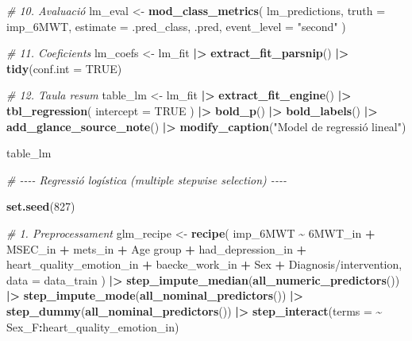 \documentclass[CAT]{TFUOC}%
\newenvironment{Shaded}{\begin{snugshade}}{\end{snugshade}}
\newcommand{\AttributeTok}[1]{\textcolor[rgb]{0.13,0.29,0.53}{#1}}
\newcommand{\CommentTok}[1]{\textcolor[rgb]{0.56,0.35,0.01}{\textit{#1}}}
\newcommand{\ConstantTok}[1]{\textcolor[rgb]{0.56,0.35,0.01}{#1}}
\newcommand{\DecValTok}[1]{\textcolor[rgb]{0.00,0.00,0.81}{#1}}
\newcommand{\FunctionTok}[1]{\textcolor[rgb]{0.13,0.29,0.53}{\textbf{#1}}}
\newcommand{\NormalTok}[1]{#1}
\newcommand{\OtherTok}[1]{\textcolor[rgb]{0.56,0.35,0.01}{#1}}
\newcommand{\SpecialCharTok}[1]{\textcolor[rgb]{0.81,0.36,0.00}{\textbf{#1}}}
\newcommand{\StringTok}[1]{\textcolor[rgb]{0.31,0.60,0.02}{#1}}
\begin{document}
\begin{Shaded}
\begin{Highlighting}[]
\CommentTok{\# 10. Avaluació}
\NormalTok{lm\_eval }\OtherTok{\textless{}{-}} \FunctionTok{mod\_class\_metrics}\NormalTok{(}
\NormalTok{  lm\_predictions, }
  \AttributeTok{truth =}\NormalTok{ imp\_6MWT, }
  \AttributeTok{estimate =}\NormalTok{ .pred\_class, }
\NormalTok{  .pred, }
  \AttributeTok{event\_level =} \StringTok{"second"}
\NormalTok{)}

\CommentTok{\# 11. Coeficients}
\NormalTok{lm\_coefs }\OtherTok{\textless{}{-}}\NormalTok{ lm\_fit }\SpecialCharTok{|\textgreater{}} 
  \FunctionTok{extract\_fit\_parsnip}\NormalTok{() }\SpecialCharTok{|\textgreater{}} 
  \FunctionTok{tidy}\NormalTok{(}\AttributeTok{conf.int =} \ConstantTok{TRUE}\NormalTok{)}

\CommentTok{\# 12. Taula resum}
\NormalTok{table\_lm }\OtherTok{\textless{}{-}}\NormalTok{ lm\_fit }\SpecialCharTok{|\textgreater{}} 
  \FunctionTok{extract\_fit\_engine}\NormalTok{() }\SpecialCharTok{|\textgreater{}} 
  \FunctionTok{tbl\_regression}\NormalTok{(}
    \AttributeTok{intercept =} \ConstantTok{TRUE}
\NormalTok{  ) }\SpecialCharTok{|\textgreater{}} 
  \FunctionTok{bold\_p}\NormalTok{() }\SpecialCharTok{|\textgreater{}} 
  \FunctionTok{bold\_labels}\NormalTok{() }\SpecialCharTok{|\textgreater{}} 
  \FunctionTok{add\_glance\_source\_note}\NormalTok{() }\SpecialCharTok{|\textgreater{}} 
  \FunctionTok{modify\_caption}\NormalTok{(}\StringTok{"Model de regressió lineal"}\NormalTok{)}

\NormalTok{table\_lm}

\CommentTok{\# {-}{-}{-}{-} Regressió logística (multiple stepwise selection) {-}{-}{-}{-}}

\FunctionTok{set.seed}\NormalTok{(}\DecValTok{827}\NormalTok{)}

\CommentTok{\# 1. Preprocessament}
\NormalTok{glm\_recipe }\OtherTok{\textless{}{-}} \FunctionTok{recipe}\NormalTok{(}
\NormalTok{  imp\_6MWT }\SpecialCharTok{\textasciitilde{}} \StringTok{\textasciigrave{}}\AttributeTok{6MWT\_in}\StringTok{\textasciigrave{}} \SpecialCharTok{+}\NormalTok{ MSEC\_in }\SpecialCharTok{+}\NormalTok{ mets\_in }\SpecialCharTok{+} \StringTok{\textasciigrave{}}\AttributeTok{Age group}\StringTok{\textasciigrave{}} \SpecialCharTok{+}\NormalTok{ had\_depression\_in }\SpecialCharTok{+} 
\NormalTok{    heart\_quality\_emotion\_in }\SpecialCharTok{+}\NormalTok{ baecke\_work\_in }\SpecialCharTok{+}\NormalTok{ Sex }\SpecialCharTok{+} \StringTok{\textasciigrave{}}\AttributeTok{Diagnosis/intervention}\StringTok{\textasciigrave{}}\NormalTok{, }
  \AttributeTok{data =}\NormalTok{ data\_train}
\NormalTok{) }\SpecialCharTok{|\textgreater{}} 
  \FunctionTok{step\_impute\_median}\NormalTok{(}\FunctionTok{all\_numeric\_predictors}\NormalTok{()) }\SpecialCharTok{|\textgreater{}} 
  \FunctionTok{step\_impute\_mode}\NormalTok{(}\FunctionTok{all\_nominal\_predictors}\NormalTok{()) }\SpecialCharTok{|\textgreater{}} 
  \FunctionTok{step\_dummy}\NormalTok{(}\FunctionTok{all\_nominal\_predictors}\NormalTok{()) }\SpecialCharTok{|\textgreater{}} 
  \FunctionTok{step\_interact}\NormalTok{(}\AttributeTok{terms =} \SpecialCharTok{\textasciitilde{}}\NormalTok{ Sex\_F}\SpecialCharTok{:}\NormalTok{heart\_quality\_emotion\_in)}


\end{Highlighting}
\end{Shaded}
\end{document}
